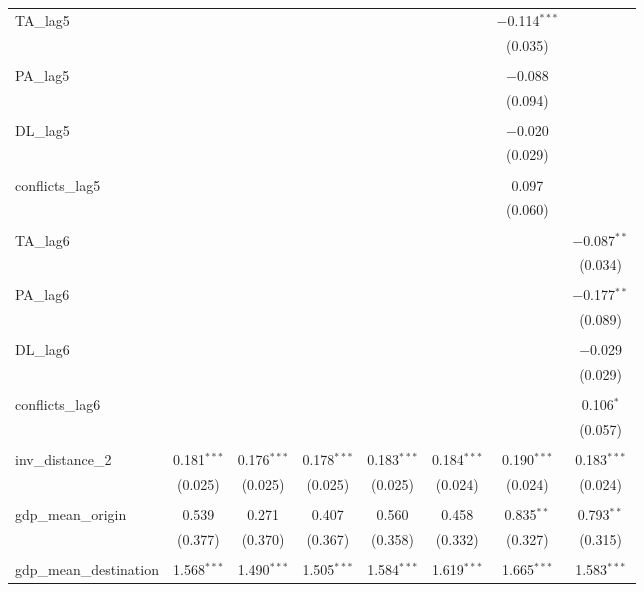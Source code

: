 \begin{table}[!htbp]
\begin{tabular}{@{\extracolsep{5pt}}lccccccc}
 TA\_lag5 &  &  &  &  &  & $-$0.114$^{***}$ &  \\ 
  &  &  &  &  &  & (0.035) &  \\ 
  & & & & & & & \\ 
 PA\_lag5 &  &  &  &  &  & $-$0.088 &  \\ 
  &  &  &  &  &  & (0.094) &  \\ 
  & & & & & & & \\ 
 DL\_lag5 &  &  &  &  &  & $-$0.020 &  \\ 
  &  &  &  &  &  & (0.029) &  \\ 
  & & & & & & & \\ 
 conflicts\_lag5 &  &  &  &  &  & 0.097 &  \\ 
  &  &  &  &  &  & (0.060) &  \\ 
  & & & & & & & \\ 
 TA\_lag6 &  &  &  &  &  &  & $-$0.087$^{**}$ \\ 
  &  &  &  &  &  &  & (0.034) \\ 
  & & & & & & & \\ 
 PA\_lag6 &  &  &  &  &  &  & $-$0.177$^{**}$ \\ 
  &  &  &  &  &  &  & (0.089) \\ 
  & & & & & & & \\ 
 DL\_lag6 &  &  &  &  &  &  & $-$0.029 \\ 
  &  &  &  &  &  &  & (0.029) \\ 
  & & & & & & & \\ 
 conflicts\_lag6 &  &  &  &  &  &  & 0.106$^{*}$ \\ 
  &  &  &  &  &  &  & (0.057) \\ 
  & & & & & & & \\ 
 inv\_distance\_2 & 0.181$^{***}$ & 0.176$^{***}$ & 0.178$^{***}$ & 0.183$^{***}$ & 0.184$^{***}$ & 0.190$^{***}$ & 0.183$^{***}$ \\ 
  & (0.025) & (0.025) & (0.025) & (0.025) & (0.024) & (0.024) & (0.024) \\ 
  & & & & & & & \\ 
 gdp\_mean\_origin & 0.539 & 0.271 & 0.407 & 0.560 & 0.458 & 0.835$^{**}$ & 0.793$^{**}$ \\ 
  & (0.377) & (0.370) & (0.367) & (0.358) & (0.332) & (0.327) & (0.315) \\ 
  & & & & & & & \\ 
 gdp\_mean\_destination & 1.568$^{***}$ & 1.490$^{***}$ & 1.505$^{***}$ & 1.584$^{***}$ & 1.619$^{***}$ & 1.665$^{***}$ & 1.583$^{***}$ \\ 

\end{tabular}
\end{table}
